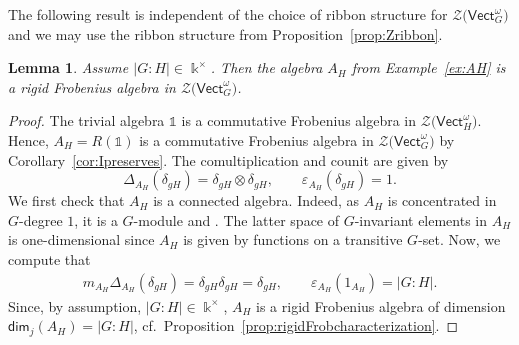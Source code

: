 \documentclass[pdftex]{sigma}
\numberwithin{equation}{section}
\newtheorem{Lemma}[Theorem]{Lemma}
\newcommand{\Hom}{\mathsf{Hom}}
\newcommand{\one}{\mathds{1}}
\renewcommand{\dim}{\mathsf{dim}}
\newcommand{\Vect}{\mathsf{Vect}}
\newcommand{\cZ}{\mathcal{Z}}
\begin{document}
The following result is independent of the choice of ribbon structure for $\cZ\big(\Vect_G^\omega\big)$ and we may use the ribbon structure from Proposition~\ref{prop:Zribbon}.
\begin{Lemma}\label{lem:AH-rigidFrob}
Assume $|G:H|\in \Bbbk^\times$. Then the algebra $A_H$ from Example~{\rm \ref{ex:AH}} is a rigid Frobenius algebra in $\cZ\big(\Vect_G^\omega\big)$.
\end{Lemma}
\begin{proof}
The trivial algebra $\one$ is a commutative Frobenius algebra in $\cZ\big(\Vect_H^\omega\big)$. Hence, ${A_H\!=\!R(\one)}$ is a commutative Frobenius algebra in $\cZ\big(\Vect_G^\omega\big)$ by Corollary~\ref{cor:Ipreserves}. The comultiplication and counit are given by
\[\Delta_{A_H}(\delta_{gH})=\delta_{gH}\otimes \delta_{gH}, \qquad \varepsilon_{A_H}(\delta_{gH})=1.\]
We first check that $A_H$ is a connected algebra. Indeed, as $A_H$ is concentrated in $G$-degree $1$, it is a $G$-module and
\smash{$\Hom_{\cZ(\Vect_G^\omega)}(\one,A_H)\subseteq (A_H)^G$}. The latter space of $G$-invariant elements in $A_H$ is one-dimensional since $A_H$ is given by functions on a transitive $G$-set.
Now, we compute that
\begin{align*}
 m_{A_H} \Delta_{A_H}(\delta_{gH})=\delta_{gH}\delta_{gH}=\delta_{gH}, \qquad \varepsilon_{A_H}(1_{A_H})=|G:H|.
\end{align*}
Since, by assumption, $|G:H|\in \Bbbk^\times$, $A_H$ is a rigid Frobenius algebra of dimension $\dim_j(A_H)=|G:H|$, cf.\ Proposition~\ref{prop:rigidFrobcharacterization}.
\end{proof}
\end{document}
